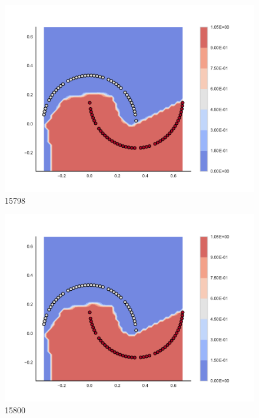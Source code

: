 \begin{subfigure}[b]{0.09\textwidth}
    \includegraphics[clip, trim=2.35cm 1.75cm 4.5cm 0cm,width=\textwidth]{img/convergence/15798.pdf}
    \caption{15798}
    \label{fig:convergence_15798}
\end{subfigure}
%
\begin{subfigure}[b]{0.09\textwidth}
    \includegraphics[clip, trim=2.35cm 1.75cm 4.5cm 0cm,width=\textwidth]{img/convergence/15800.pdf}
    \caption{15800}
    \label{fig:convergence_15800}
\end{subfigure}
%
